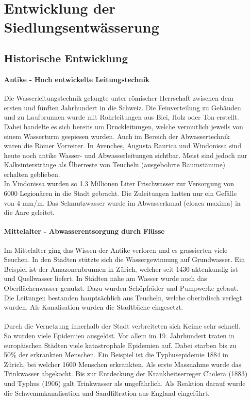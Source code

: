 \documentclass[9pt, openright=false]{scrartcl}
\begin{document}
\section{Entwicklung der Siedlungsentwässerung}
\subsection{Historische Entwicklung}
\paragraph{Antike - Hoch entwickelte Leitungstechnik} Die Wasserleitungstechnik gelangte unter römischer Herrschaft zwischen dem ersten und fünften Jahrhundert in die Schweiz. Die Feinverteilung zu Gebäuden und zu Laufbrunnen wurde mit Rohrleitungen aus Blei, Holz oder Ton erstellt. Dabei handelte es sich bereits um Druckleitungen, welche vermutlich jeweils von einem Wasserturm gespiesen wurden. Auch im Bereich der Abwassertechnik waren die Römer Vorreiter. In Avenches, Augusta Raurica und Windonissa sind heute noch antike Wasser- und Abwasserleitungen sichtbar. Meist sind jedoch nur Kalksinterstränge als Überreste von Teucheln (ausgebohrte Baumstämme) erhalten geblieben.\\
In Vindonissa wurden so 1.3 Millionen Liter Frischwasser zur Versorgung von 6000 Legionären in die Stadt gebracht. Die Zuleitungen hatten nur ein Gefälle von 4 mm/m. Das Schmutzwasser wurde im Abwasserkanal (cloaca maxima) in die Aare geleitet.
\paragraph{Mittelalter - Abwasserentsorgung durch Flüsse} Im Mittelalter ging das Wissen der Antike verloren und es grassierten viele Seuchen. In den Städten stützte sich die Wassergewinnung auf Grundwasser. Ein Beispiel ist der Amazonenbrunnen in Zürich, welcher seit 1430 aktenkundig ist und Quellwasser liefert. In Städten nahe am Wasser wurde auch das Oberflächenwasser genutzt. Dazu wurden Schöpfräder und Pumpwerke gebaut. Die Leitungen bestanden hauptsächlich aus Teucheln, welche oberirdisch verlegt wurden. Als Kanalisation wurden die Stadtbäche eingesetzt.\\ \\ Durch die Vernetzung innerhalb der Stadt verbreiteten sich Keime sehr schnell. So wurden viele Epidemien ausgelöst. Vor allem im 19. Jahrhundert traten in europäischen Städten viele katastrophale Epidemien auf. Dabei starben bis zu 50\% der erkrankten Menschen. Ein Beispiel ist die Typhusepidemie 1884 in Zürich, bei welcher 1600 Menschen erkrankten. Als erste Massnahme wurde das Trinkwasser abgekocht. Bis zur Entdeckung der Krankheitserreger Cholera (1883) und Typhus (1906) galt Trinkwasser als \glqq ungefährlich\grqq . Als Reaktion darauf wurde die Schwemmkanalisation und Sandfiltration aus England eingeführt.
\end{document}
